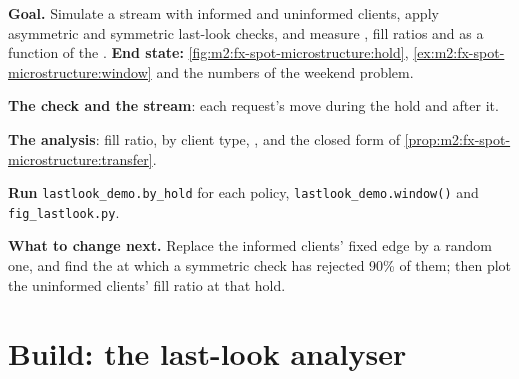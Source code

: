 \begin{tutorial}
\textbf{Goal.} Simulate a stream with informed and uninformed clients, apply
asymmetric and symmetric last-look checks, and measure , fill ratios
and  as a function of the . \textbf{End state:}
\cref{fig:m2:fx-spot-microstructure:hold}, \cref{ex:m2:fx-spot-microstructure:window}
and the numbers of the weekend problem.
\begin{tutsteps}
\item \textbf{The check and the stream}: each request's move during the hold
and after it.
\label{lst:m2:fx-spot-microstructure:sim}
\item \textbf{The analysis}: fill ratio,  by client type, ,
and the closed form of \cref{prop:m2:fx-spot-microstructure:transfer}.
\label{lst:m2:fx-spot-microstructure:tca}
\item \textbf{Run} \texttt{lastlook\_demo.by\_hold} for each policy,
\texttt{lastlook\_demo.window()} and \texttt{fig\_lastlook.py}.
\end{tutsteps}
\textbf{What to change next.} Replace the informed clients' fixed edge by a
random one, and find the  at which a symmetric check has rejected 90\%
of them; then plot the uninformed clients' fill ratio at that hold.
\end{tutorial}

\section{Build: the last-look analyser}\label{bld:m2:fx-spot-microstructure:lastlook}

